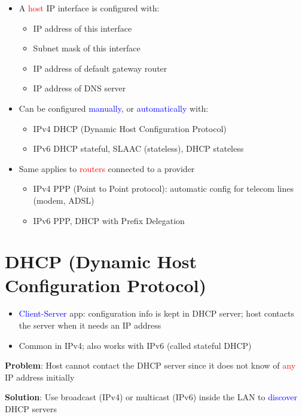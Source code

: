 \documentclass[11pt]{article}
\begin{document}
\begin{itemize}
	\item A \textcolor{red}{host} IP interface is configured with:
	\begin{itemize}
		\item IP address of this interface
		\item Subnet mask of this interface
		\item IP address of default gateway router
		\item IP address of DNS server
	\end{itemize}

	\item Can be configured \textcolor{blue}{manually}, or \textcolor{blue}{automatically} with:
		\begin{itemize}
			\item IPv4 DHCP (Dynamic Host Configuration Protocol)
			\item IPv6 DHCP stateful, SLAAC (stateless), DHCP stateless
		\end{itemize}
	\item Same applies to \textcolor{red}{routers} connected to a provider
		\begin{itemize}
			\item IPv4 PPP (Point to Point protocol): automatic config for telecom lines (modem, ADSL)
			\item IPv6 PPP, DHCP with Prefix Delegation
		\end{itemize}
\end{itemize}


\section*{DHCP (Dynamic Host Configuration Protocol)}

\begin{itemize}
	\item \textcolor{blue}{Client-Server} app: configuration info is kept in DHCP server; host contacts the server when it needs an IP address
	\item Common in IPv4; also works with IPv6 (called stateful DHCP)
\end{itemize}

\textbf{Problem}: Host cannot contact the DHCP server since it does not know of \textcolor{red}{any} IP address initially

\textbf{Solution}: Use broadcast (IPv4) or multicast (IPv6) inside the LAN to \textcolor{blue}{discover} DHCP servers
\end{document}
